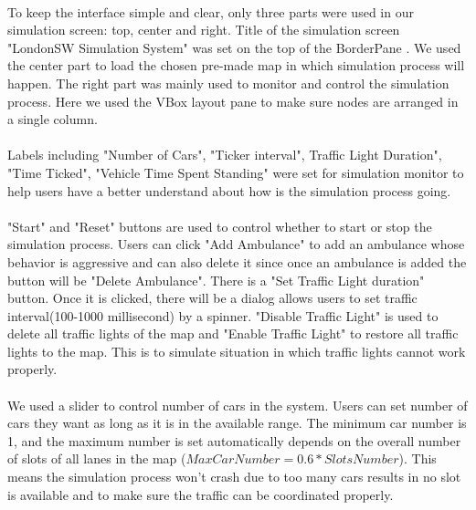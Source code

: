 \documentclass[a4paper,11pt,titlepage]{article}
\begin{document}
\paragraph{}
To keep the interface simple and clear, only three parts were used in our simulation screen: top, center and right. Title of the simulation screen "LondonSW Simulation System" was set on the top of the BorderPane . We used the center part to load the chosen pre-made map in which simulation process will happen. The right part was mainly used to monitor and control the simulation process. Here we used the VBox layout pane to make sure nodes are arranged in a single column. 
\paragraph{}
Labels including "Number of Cars", "Ticker interval", Traffic Light Duration", "Time Ticked", "Vehicle Time Spent Standing" were set for simulation monitor to help users have a better understand about how is the simulation process going. 
\paragraph{}
"Start" and "Reset" buttons are used to control whether to start or stop the simulation process. Users can click "Add Ambulance" to add an ambulance whose behavior is aggressive and can also delete it since once an ambulance is added the button will be "Delete Ambulance". There is a "Set Traffic Light duration" button. Once it is clicked, there will be a dialog allows users to set traffic interval(100-1000 millisecond) by a spinner. "Disable Traffic Light" is used to delete all traffic lights of the map and "Enable Traffic Light" to restore all traffic lights to the map. This is to simulate situation in which traffic lights cannot work properly. 
\paragraph{}
We used a slider to control number of cars in the system. Users can set number of cars they want as long as  it is in the available range. The minimum car number is 1, and the maximum number is set automatically depends on the overall number of slots of all lanes in the map ($MaxCarNumber=0.6*SlotsNumber$). This means the simulation process won't crash due to too many cars results in no slot is available and to make sure the traffic can be coordinated properly. 
\end{document}
